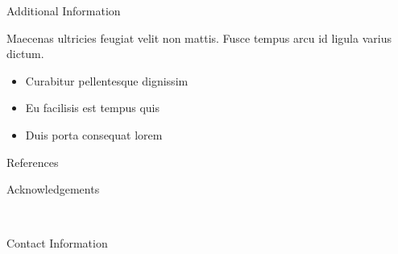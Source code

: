 \documentclass[final]{beamer}
\newlength{\onecolwid}
\begin{document}
\begin{frame}[t]
\begin{columns}[t]
\begin{column}{\onecolwid}
\begin{block}{Additional Information}

Maecenas ultricies feugiat velit non mattis. Fusce tempus arcu id ligula varius dictum. 
\begin{itemize}
\item Curabitur pellentesque dignissim
\item Eu facilisis est tempus quis
\item Duis porta consequat lorem
\end{itemize}

\end{block}


\begin{block}{References}

\nocite{*} %
\small{
\vspace{0.75in}}

\end{block}



\begin{block}{Acknowledgements}

\small{} \\

\end{block}



\begin{alertblock}{Contact Information}


\end{alertblock}
\end{column}
\end{columns}
\end{frame}
\end{document}
